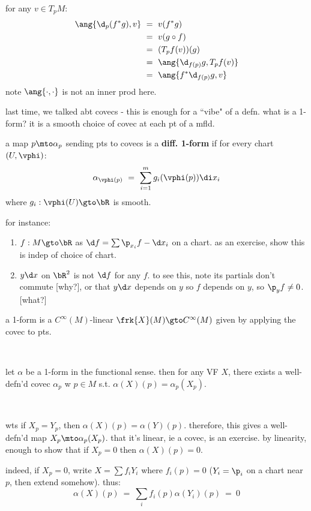 \begin{pf}
	for any $v\in T_{p}M$:
	\begin{align*}
		\ang{\d_{p}(f^{*}g),v}
		& \ = \ v(f^{*}g) \\
		& \ = \ v(g\circ f) \\
		& \ = \ (T_{p}f(v))(g) \\
		& \ = \ \ang{\d_{f(p)}g,T_{p}f(v)} \\
		& \ = \ \ang{f^{*}\d_{f(p)}g,v}
	\end{align*}
	note $\ang{\cdot,\cdot}$ is not an inner prod here.
\end{pf}

last time, we talked abt covecs - this is enough for a ``vibe" of a defn.
what is a 1-form?
it is a smooth choice of covec at each pt of a mfld.

\begin{defn}[title=Coordinate-wise]
	a map $p\mto\alpha_{p}$ sending pts to covecs is a \textbf{diff. 1-form} if
	for every chart $(U,\vphi)$:
	\begin{equation*}
		\alpha_{\vphi(p)} \ = \ \sum_{i=1}^{m}g_{i}(\vphi(p))\di x_{i}
	\end{equation*}
	where $g_{i}:\vphi(U)\gto\bR$ is smooth.
\end{defn}

for instance:
\begin{enumerate}[1)]
	\item $f:M\gto\bR$ as $\d f = \sum\p_{x_{i}}f-\d x_{i}$ on a chart.
		as an exercise, show this is indep of choice of chart.
	\item $y\d x$ on $\bR^{2}$ is not $\d f$ for any $f$.
		to see this, note its partials don't commute [why?], or that
		$y\d x$ depends on $y$ so $f$ depends on $y$, so $\p_{y}f\neq0$.
		[what?]
\end{enumerate}

\begin{defn}[title=Functional]
	a 1-form is a $C^{\infty}(M)$-linear $\frk{X}(M)\gto C^{\infty}(M)$
	given by applying the covec to pts.
\end{defn} \

\begin{prop}
	let $\alpha$ be a 1-form in the functional sense.
	then for any VF $X$, there exists a well-defn'd covec $\alpha_{p}$ w $p\in M$ s.t.
	$\alpha(X)(p)=\alpha_{p}(X_{p})$.
\end{prop} \

\begin{pf}
	wts if $X_{p}=Y_{p}$, then $\alpha(X)(p)=\alpha(Y)(p)$.
	therefore, this gives a well-defn'd map $X_{p}\mto\alpha_{p}(X_{p})$.
	that it's linear, ie a covec, is an exercise.
	by linearity, enough to show that if $X_{p}=0$ then $\alpha(X)(p)=0$.

	indeed, if $X_{p}=0$, write $X=\sum f_{i}Y_{i}$ where $f_{i}(p)=0$
	($Y_{i}=\p_{i}$ on a chart near $p$, then extend somehow).
	thus:
	\begin{equation*}
		\alpha(X)(p) \ = \ \sum_{i}f_{i}(p)\alpha(Y_{i})(p) \ = \ 0
	\end{equation*}
\end{pf} \

